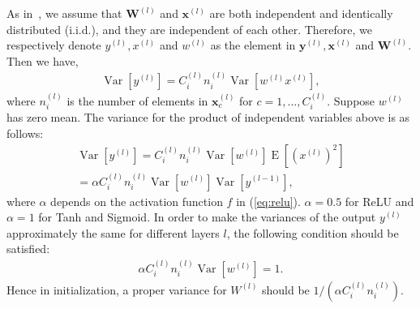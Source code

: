 \documentclass[10pt,twocolumn,letterpaper]{article}
\newcommand{\W}{\mathbf{W}}
\newcommand{\bx}{\mathbf{x}}
\newcommand{\by}{\mathbf{y}}
\newcommand{\Var}{\operatorname{Var}}
\newcommand{\E}{\operatorname{E}}
\begin{document}
As in~\cite{glorot2010understanding,he2015delving}, we assume that $\W^{(l)}$ and $\bx^{(l)}$ are both independent and identically distributed (i.i.d.), and they are independent of each other. Therefore, we respectively denote $y^{(l)}, x^{(l)}$ and $w^{(l)}$ as  the element in $\by^{(l)}, \bx^{(l)}$ and $\W^{(l)}$.  Then we have,
{\small
\begin{align}
\Var \left[y^{(l)}\right] = C^{(l)}_in^{(l)}_i \Var\left[w^{(l)} x^{(l)}\right] ,
\end{align}
}
\!\!where $n_i^{(l)}$ is the number of elements in $\bx_c^{(l)}$ for $c=1, \ldots, C_i^{(l)}$. Suppose $w^{(l)}$ has zero mean. The variance for the product of independent variables above is as follows:
{\small
\begin{align*}
\Var \left[y^{(l)}\right] = C^{(l)}_in^{(l)}_i \Var\left[w^{(l)}\right] \E\left[\left(x^{(l)}\right)^2\right] \\
= \alpha C^{(l)}_in^{(l)}_i\Var\left[w^{(l)}\right] \Var \left[y^{(l-1)}\right],
\end{align*}
}
\!\!where $\alpha$ depends on the activation function $f$ in (\ref{eq:relu}). $\alpha=0.5$ for ReLU and $\alpha=1$ for Tanh and Sigmoid. 
In order to make the variances of the output $y^{(l)}$ approximately the same for different layers $l$, the following condition should be satisfied:
{\small
\begin{align}
\alpha C^{(l)}_in^{(l)}_i\Var\left[w^{(l)}\right] = 1.
\end{align}
}
\!\!Hence in initialization, a proper variance for $W^{(l)}$ should be $1/(\alpha C^{(l)}_in^{(l)}_i)$.
\end{document}
